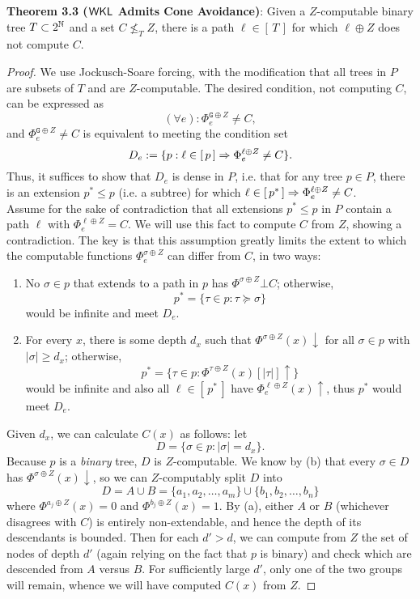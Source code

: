 \documentclass{amsart}
\begin{document}
	\noindent \textbf{Theorem 3.3 ($\sf{WKL}$ Admits Cone Avoidance)}: Given a $Z$-computable binary tree $T\subset 2^{\mathbb{N}}$ and a set $C\nleq_T Z$, there is a path $\ell\in [\,T\,]$ for which $\ell\oplus Z$ does not compute $C$. 
	\begin{proof}
		We use Jockusch-Soare forcing, with the modification that all trees in $P$ are subsets of $T$ and are $Z$-computable. The desired condition, not computing $C$, can be expressed as
		$$
		(\forall e): \Phi_e^{\mathtt{G}\oplus Z}\neq C,
		$$
		and $\Phi_e^{\mathtt{G}\oplus Z} \neq C$ is equivalent to meeting the condition set
		$$
		D_e := \{p: \ell \in [\, p \,] \Rightarrow \Phi_e^{\ell\oplus Z}\neq C\}.
		$$
		Thus, it suffices to show that $D_e$ is dense in $P$, i.e. that for any tree $p\in P$, there is an extension $p^*\leq p$ (i.e. a subtree) for which $\ell\in [\,p^*\,] \Rightarrow \Phi_e^{\ell\oplus Z}\neq C$.\\
		
		Assume for the sake of contradiction that all extensions $p^*\leq p$ in $P$ contain a path $\ell$ with $\Phi_e^{\ell\oplus Z}=C$. We will use this fact to compute $C$ from $Z$, showing a contradiction. The key is that this assumption greatly limits the extent to which the computable functions $\Phi_e^{\sigma\oplus Z}$ can differ from $C$, in two ways:
		\begin{enumerate}[label=(\alph*)]
			\item No $\sigma\in p$ that extends to a path in $p$ has $\Phi^{\sigma\oplus Z}\bot C$; otherwise,
			$$p^*=\{\tau\in p :\tau\succeq \sigma \}$$ 
			would be infinite and meet $D_e$.
			\item For every $x$, there is some depth $d_x$ such that $\Phi^{\sigma\oplus Z}(x)\downarrow$ for all $\sigma\in p$ with $|\sigma|\geq d_x$; otherwise, 
			$$p^*=\{\tau\in p:\Phi^{\tau\oplus Z}(x)[|\tau|]\uparrow \}$$
			would be infinite and also all $\ell\in [\,p^*\,]$ have $\Phi_e^{\ell\oplus Z}(x)\uparrow$, thus $p^*$ would meet $D_e$.
		\end{enumerate}
		Given $d_x$, we can calculate $C(x)$ as follows: let 
		$$D = \{\sigma\in p : |\sigma| = d_x\}.$$
		Because $p$ is a \textit{binary} tree, $D$ is $Z$-computable. We know by (b) that every $\sigma\in D$ has $\Phi^{\sigma\oplus Z}(x)\downarrow$, so we can $Z$-computably split $D$ into 
		$$
		D = A\cup B = \{a_1,a_2,\dots,a_m\}\cup \{b_1,b_2,\dots,b_n\}
		$$
		where $\Phi^{a_j\oplus Z}(x)=0$ and $\Phi^{b_j\oplus Z}(x)=1$. By (a), either $A$ or $B$ (whichever disagrees with $C$) is entirely non-extendable, and hence the depth of its descendants is bounded. Then for each $d'>d$, we can compute from $Z$ the set of nodes of depth $d'$ (again relying on the fact that $p$ is binary) and check which are descended from $A$ versus $B$. For sufficiently large $d'$, only one of the two groups will remain, whence we will have computed $C(x)$ from $Z$.
	\end{proof}\\
	
\end{document}
